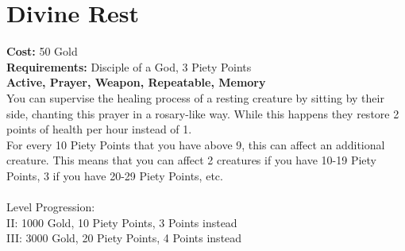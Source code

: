 \section{Divine Rest}
\textbf{Cost:} 50 Gold\\
\textbf{Requirements:} Disciple of a God, 3 Piety Points \\
\textbf{Active, Prayer, Weapon, Repeatable, Memory}\\
You can supervise the healing process of a resting creature by sitting by their side, chanting this prayer in a rosary-like way. While this happens they restore 2 points of health per hour instead of 1.\\
For every 10 Piety Points that you have above 9, this can affect an additional creature. This means that you can affect 2 creatures if you have 10-19 Piety Points, 3 if you have 20-29 Piety Points, etc.\\
\\
Level Progression:\\
II: 1000 Gold, 10 Piety Points, 3 Points instead\\
III: 3000 Gold, 20 Piety Points, 4 Points instead\\